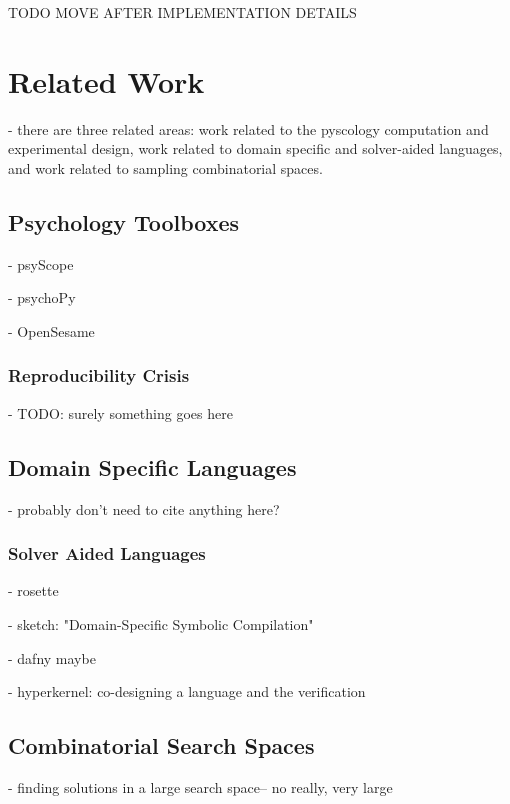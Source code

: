
TODO MOVE AFTER IMPLEMENTATION DETAILS

\chapter{Related Work}

- there are three related areas: work related to the pyscology computation and experimental design, work related to domain specific and solver-aided languages, and work related to sampling combinatorial spaces.


\section{Psychology Toolboxes}

- psyScope \cite{cohen1993psyscope}

- psychoPy \cite{mathot2012opensesame}

- OpenSesame \cite{peirce2009generating}

\subsection{Reproducibility Crisis}

- TODO: surely something goes here

\section{Domain Specific Languages}

- probably don't need to cite anything here?

\subsection{Solver Aided Languages}

- rosette \cite{torlak2014lightweight}

- sketch: "Domain-Specific Symbolic Compilation"

- dafny maybe

- hyperkernel: co-designing a language and the verification


\section{Combinatorial Search Spaces}

- finding solutions in a large search space-- no really, very large


